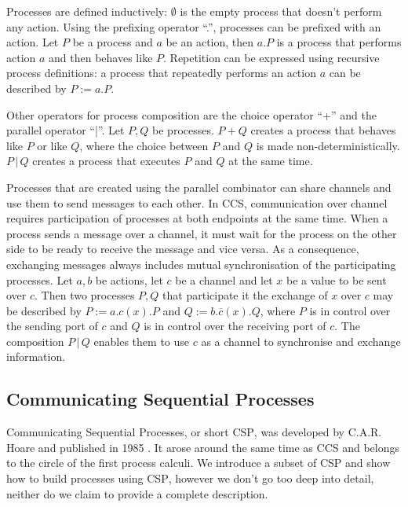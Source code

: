 Processes are defined inductively: $\emptyset$ is the empty process that doesn't perform any action. Using the prefixing operator \enquote{.}, processes can be prefixed with an action. Let $P$ be a process and $a$ be an action, then $a.P$ is a process that performs action $a$ and then behaves like $P$. Repetition can be expressed using recursive process definitions: a process that repeatedly performs an action $a$ can be described by $P := a.P$.

Other operators for process composition are the choice operator \enquote{+} and the parallel operator \enquote{|}. Let $P, Q$ be processes. $P + Q$ creates a process that behaves like $P$ or like $Q$, where the choice between $P$ and $Q$ is made non-deterministically. $P \,|\, Q$ creates a process that executes $P$ and $Q$ at the same time.

Processes that are created using the parallel combinator can share channels and use them to send messages to each other. In \textsc{CCS}, communication over channel requires participation of processes at both endpoints at the same time. When a process sends a message over a channel, it must wait for the process on the other side to be ready to receive the message and vice versa. As a consequence, exchanging messages always includes mutual synchronisation of the participating processes. Let $a, b$ be actions, let $c$ be a channel and let $x$ be a value to be sent over $c$. Then two processes $P, Q$ that participate it the exchange of $x$ over $c$ may be described by $P := a.c\left(x\right).P$ and $Q := b.\overline{c}\left(x\right).Q$, where $P$ is in control over the sending port of $c$ and $Q$ is in control over the receiving port of $c$. The composition $P \,|\, Q$ enables them to use $c$ as a channel to synchronise and exchange information.

\subsection{Communicating Sequential Processes}
Communicating Sequential Processes, or short \textsc{CSP}, was developed by C.A.R. Hoare and published in 1985 \cite{Hoare:1985:CSP:3921}. It arose around the same time as \textsc{CCS} and belongs to the circle of the first process calculi. We introduce a subset of \textsc{CSP} and show how to build processes using \textsc{CSP}, however we don't go too deep into detail, neither do we claim to provide a complete description.


